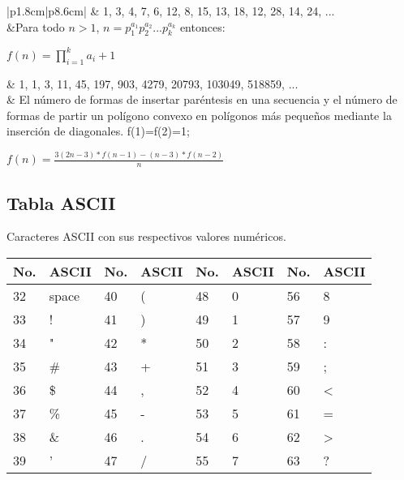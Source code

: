 \documentclass[10pt,landscape,twocolumn,letterpaper,twosided]{article}
\begin{document}
{{\begin{center}
{\begin{supertabular}{|p{1.8cm}|p{8.6cm}|}
						& 1, 3, 4, 7, 6, 12, 8, 15, 13, 18, 12, 28, 14, 24, ...
						\\ 
						&Para todo $n>1$, 
						$n=\displaystyle p_{1}^{\textstyle a_{1}}\displaystyle p_{2}^{\textstyle a_{2}}...
						\displaystyle p_{k}^{\textstyle a_{k}}$ entonces:

						$f(n) = \prod_{i=1}^{k} a_{i}+1$
						\\ \hline

						& 1, 1, 3, 11, 45, 197, 903, 4279, 20793, 103049, 518859, ...
						\\  
						& El número de formas de insertar paréntesis en una secuencia y el número de formas de partir un
						polígono convexo en polígonos más pequeños mediante la inserción de diagonales. f(1)=f(2)=1;

						$f(n) = \displaystyle\frac{3(2n-3)*f(n-1) - (n-3)*f(n-2)}{n}$
						\\ \hline

					\end{supertabular}
					}
				\end{center}		
		
		\subsection{Tabla ASCII}
			Caracteres ASCII con sus respectivos valores numéricos.
			\begin{table}[H]
				\begin{tabular}{|l|l|l|l|l|l|l|l|}
					\hline \textbf{No.} & \textbf{ASCII} & \textbf{No.} & \textbf{ASCII}  &
						\textbf{No.} & \textbf{ASCII} & \textbf{No.} & \textbf{ASCII} \\ \hline
					32 & space & 40 & ( & 48 & 0 & 56 & 8 \\ \hline
					33 &  ! & 41 & ) & 49 & 1 & 57 & 9 \\ \hline
					34 &  " & 42 & * & 50 & 2 & 58 & : \\ \hline
					35 & \# & 43 & + & 51 & 3 & 59 & ; \\ \hline
					36 & \$ & 44 & , & 52 & 4 & 60 & < \\ \hline
					37 & \% & 45 & - & 53 & 5 & 61 & = \\ \hline
					38 & \& & 46 & . & 54 & 6 & 62 & > \\ \hline
					39 &  ' & 47 & / & 55 & 7 & 63 & ? \\ \hline
				\end{tabular}
			\end{table}
		
}}
\end{document}
